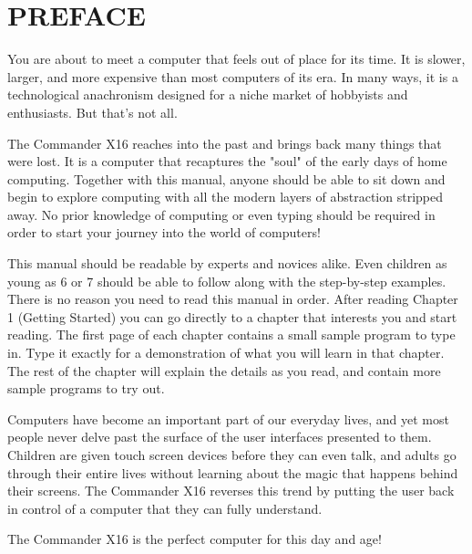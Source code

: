 
\section*{PREFACE}

\par You are about to meet a computer that feels out of place for its time.  It
is slower, larger, and more expensive than most computers of its era.  In many
ways, it is a technological anachronism designed for a niche market of
hobbyists and enthusiasts.  But that's not all.

\medskip
\par The Commander X16 reaches into the past and brings back many things that
were lost.  It is a computer that recaptures the "soul" of the early days of
home computing.  Together with this manual, anyone should be able to sit down
and begin to explore computing with all the modern layers of abstraction
stripped away.  No prior knowledge of computing or even typing should be
required in order to start your journey into the world of computers!

\medskip
\par This manual should be readable by experts and novices alike.  Even children as
young as 6 or 7 should be able to follow along with the step-by-step examples.
There is no reason you need to read this manual in order.  After reading
Chapter 1 (Getting Started) you can go directly to a chapter that interests you
and start reading.  The first page of each chapter contains a small sample
program to type in.  Type it exactly for a demonstration of what you will learn
in that chapter.  The rest of the chapter will explain the details as you read,
and contain more sample programs to try out.


\medskip
\par Computers have become an important part of our everyday lives, and yet most
people never delve past the surface of the user interfaces presented to them.
Children are given touch screen devices before they can even talk, and adults
go through their entire lives without learning about the magic that happens
behind their screens.  The Commander X16 reverses this trend by putting the
user back in control of a computer that they can fully understand.

\medskip
\par The Commander X16 is the perfect computer for this day and age!
